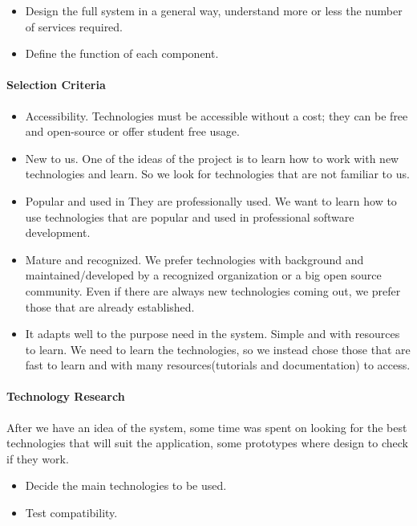 \begin{itemize}
	\item Design the full system in a general way, understand more or less the number of services required.
	\item Define the function of each component.
	
\end{itemize}

\paragraph{Selection Criteria}
\label{sel:criteria}
\begin{itemize}
	

\item Accessibility. Technologies must be accessible without a cost; they can be free and open-source or offer student free usage.
\item New to us. One of the ideas of the project is to learn how to work with new technologies and learn. So we look for technologies that are not familiar to us.

\item Popular and used in 
They are professionally used. We want to learn how to use technologies that are popular and used in professional software development.

\item Mature and recognized. We prefer technologies with background and maintained/developed by a recognized organization or a big open source community. Even if there are always new technologies coming out, we prefer those that are already established.

\item It adapts well to the purpose need in the system.
Simple and with resources to learn. We need to learn the technologies, so we instead chose those that are fast to learn and with many resources(tutorials and documentation) to access.
\end{itemize}
\paragraph{Technology Research}

After we have an idea of the system, some time was spent on looking for the best technologies that will suit the application, some prototypes where design to check if they work.

\begin{itemize}
	\item Decide the main technologies to be used.
	\item	Test compatibility. 
\end{itemize}



